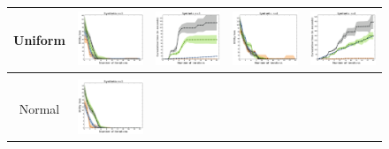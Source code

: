 \documentclass{article}
\renewcommand\[{\begin{equation}}
\renewcommand\]{\end{equation}}
\begin{document}
\begin{figure}[t]
    \centering
    {\footnotesize
    \begin{tabular}{ccccc}
        \\
        {\sc Uniform}  &
        \includegraphics[align=c,width=10em]{figures/synthetic_vs_others_3_uniform_per_iter_loss} &
        \includegraphics[align=c,width=10em]{figures/synthetic_vs_others_3_uniform_per_iter_time} &
        \includegraphics[align=c,width=10em]{figures/synthetic_vs_others_4_uniform_per_iter_loss} &
        \includegraphics[align=c,width=10em]{figures/synthetic_vs_others_4_uniform_per_iter_time}
        \\
        \hline
        \\
         {\sc Normal} &
        \includegraphics[align=c,width=10em]{figures/synthetic_vs_others_3_normal_per_iter_loss} &

\end{tabular}}
\end{figure}
\end{document}
